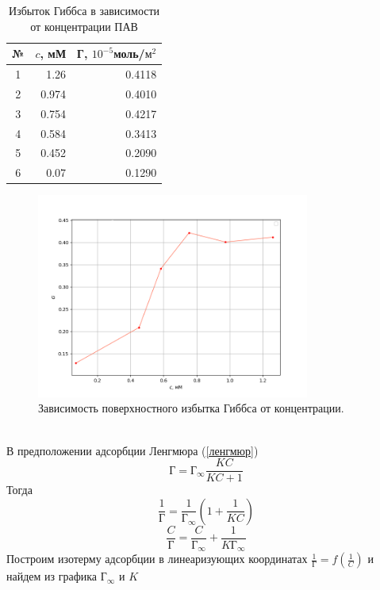 \documentclass[a4paper,12pt]{article}
\begin{document}
\begin{enumerate}
\begin{table}[h!]
\centering
\begin{tabular}{|c|r|r|}
\hline
№ & \multicolumn{1}{l|}{$c$, мМ} & \multicolumn{1}{l|}{Г, $10^{-5}$моль/$\text{м}^{2}$} \\ \hline
1 & 1.26                         & 0.4118                                               \\ \hline
2 & 0.974                        & 0.4010                                               \\ \hline
3 & 0.754                        & 0.4217                                               \\ \hline
4 & 0.584                        & 0.3413                                               \\ \hline
5 & 0.452                        & 0.2090                                               \\ \hline
6 & 0.07                         & 0.1290                                               \\ \hline
\end{tabular}
\caption{Избыток Гиббса в зависимости от концентрации ПАВ}
\label{tab:my-table}
\end{table}




\begin{figure}[h!]
    \centering
    \includegraphics[width = 0.8\textwidth]{G_cc.png}
    \caption{Зависимость поверхностного избытка Гиббса от концентрации. }
\end{figure}\\
\newpage
В предположении адсорбции Ленгмюра (\ref{ленгмюр})
\begin{equation*}
    \text{Г} = \text{Г}_{\infty}\frac{KC}{KC + 1}
\end{equation*}
Тогда 
\begin{equation*}
    \frac{1}{\text{Г}} = \frac{1}{\text{Г}_{\infty}} (1 + \frac{1}{KC})
 \end{equation*}
\begin{equation} \label{aaa}
    \frac{C}{\text{Г}} = \frac{C}{\text{Г}_{\infty}} + \frac{1}{K\text{Г}_{\infty}}
\end{equation}
Построим изотерму адсорбции в линеаризующих координатах $\frac{1}{\text{Г}} = f(\frac{1}{C})$ и найдем из графика $\text{Г}_{\infty}$ и $K$


\end{enumerate}
\end{document}

